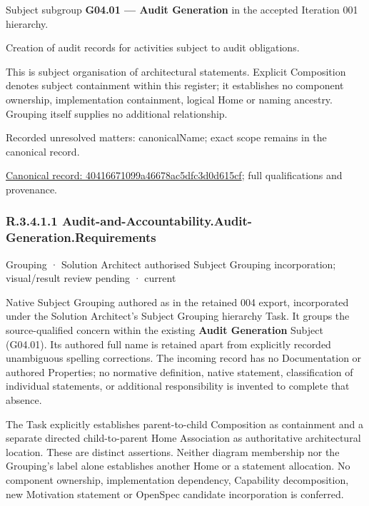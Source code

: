 Subject subgroup \textbf{G04.01 — Audit Generation} in the accepted Iteration 001 hierarchy.



Creation of audit records for activities subject to audit obligations.



This is subject organisation of architectural statements. Explicit Composition denotes subject containment within this register; it establishes no component ownership, implementation containment, logical Home or naming ancestry. Grouping itself supplies no additional relationship.


{\small Recorded unresolved matters: canonicalName; exact scope remains in the canonical record.}\par
{\footnotesize \href{../../../../continuum/grouping/40416671099a46678ac5dfc3d0d615cf.md}{Canonical record: 40416671099a46678ac5dfc3d0d615cf}; full qualifications and provenance.}\par
\subsubsection*{R.3.4.1.1 Audit-and-Accountability.Audit-Generation.Requirements}
\label{navigation:R.3.4.1.1}

\label{element:9fec9301e759460880557df71baa19c0}
{\small Grouping · Solution Architect authorised Subject Grouping incorporation; visual/result review pending · current}\par

Native Subject Grouping authored as \texttt{} in the retained 004 export,
incorporated under the Solution Architect's Subject Grouping hierarchy Task.
It groups the source-qualified \texttt{} concern within
the existing \textbf{Audit Generation} Subject (G04.01). Its authored full name
is retained apart from explicitly recorded unambiguous spelling corrections.
The incoming record has no Documentation or authored Properties; no normative
definition, native statement, classification of individual statements, or
additional responsibility is invented to complete that absence.



The Task explicitly establishes parent-to-child Composition as containment and
a separate directed child-to-parent Home Association as authoritative architectural
location. These are distinct assertions. Neither diagram membership nor the
Grouping's label alone establishes another Home or a statement allocation.
No component ownership, implementation dependency, Capability decomposition,
new Motivation statement or OpenSpec candidate incorporation is conferred.



